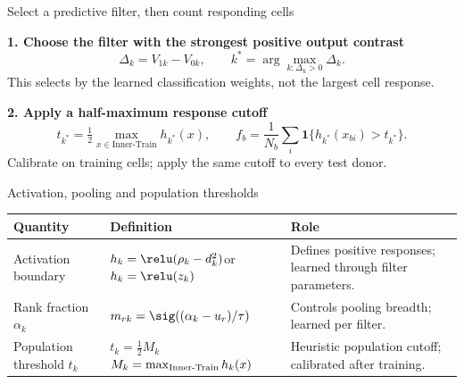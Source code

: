 \begin{frame}{Select a predictive filter, then count responding cells}

\textbf{1. Choose the filter with the strongest positive output contrast}
\[\Delta_k=V_{1k}-V_{0k},\qquad k^*=\arg\max_{k:\Delta_k>0}\Delta_k.\]
\small This selects by the learned classification weights, not the largest cell response.
\vspace{2mm}\par
\normalsize\textbf{2. Apply a half-maximum response cutoff}
\[t_{k^*}=\tfrac12\max_{x\in\mathrm{Inner\text{-}Train}}h_{k^*}(x),\qquad
f_b=\frac1{N_b}\sum_i\mathbf1\{h_{k^*}(x_{bi})>t_{k^*}\}.\]
\small Calibrate on training cells; apply the same cutoff to every test donor.

\end{frame}

\begin{frame}{Activation, pooling and population thresholds}

\renewcommand{\arraystretch}{1.7}
\begin{tabular}{@{}p{.24\linewidth}p{.33\linewidth}p{.37\linewidth}@{}}\toprule
Quantity & Definition & Role\\\midrule
Activation boundary & $h_k=\relu(\rho_k-d_k^2)$\newline or $h_k=\relu(z_k)$ & Defines positive responses; learned through filter parameters.\\
Rank fraction $\alpha_k$ & $m_{rk}=\sig((\alpha_k-u_r)/\tau)$ & Controls pooling breadth; learned per filter.\\
Population threshold $t_k$ & $t_k=\tfrac12 M_k$\newline $M_k=\max_{\rm Inner\text{-}Train}h_k(x)$ & Heuristic population cutoff; calibrated after training.\\\bottomrule
\end{tabular}

\end{frame}

